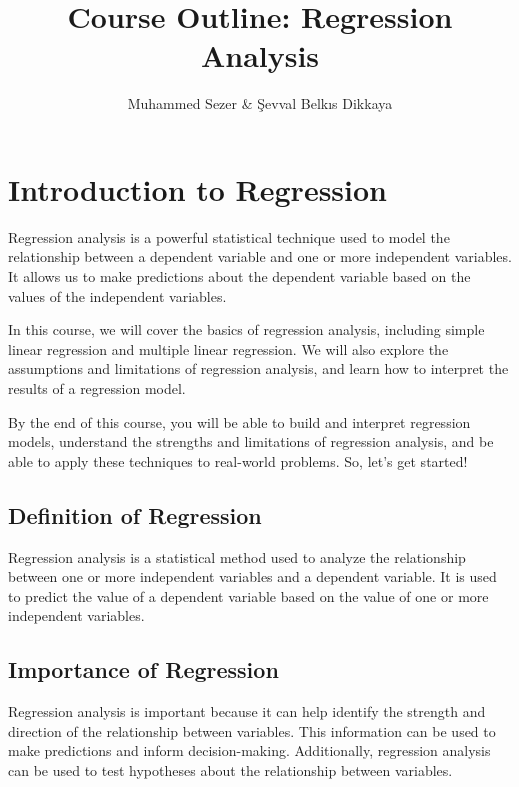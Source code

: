 \documentclass{article}
\begin{document}
\title{Course Outline: Regression Analysis}
\author{Muhammed Sezer \& Şevval Belkıs Dikkaya}
\date{}

\maketitle

\section{Introduction to Regression}

Regression analysis is a powerful statistical technique used to model the relationship between a dependent variable and one or more independent variables. It allows us to make predictions about the dependent variable based on the values of the independent variables.

In this course, we will cover the basics of regression analysis, including simple linear regression and multiple linear regression. We will also explore the assumptions and limitations of regression analysis, and learn how to interpret the results of a regression model.

By the end of this course, you will be able to build and interpret regression models, understand the strengths and limitations of regression analysis, and be able to apply these techniques to real-world problems. So, let's get started!

\subsection{Definition of Regression}

Regression analysis is a statistical method used to analyze the relationship between one or more independent variables and a dependent variable. It is used to predict the value of a dependent variable based on the value of one or more independent variables.

\subsection{Importance of Regression}

Regression analysis is important because it can help identify the strength and direction of the relationship between variables. This information can be used to make predictions and inform decision-making. Additionally, regression analysis can be used to test hypotheses about the relationship between variables.
\end{document}
